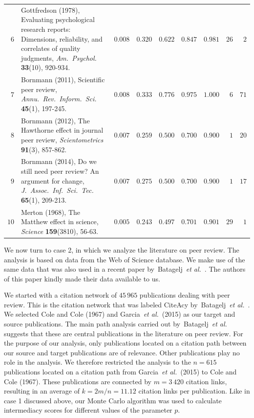 \documentclass[9pt,twocolumn,twoside,lineno]{pnas-alt}
\theoremstyle{definition}
\renewcommand{\etal}{~\emph{et al.}\xspace}
\begin{document}
\begin{sansmath}
\begin{table}
\begin{tabular}{rp{9.75cm}rrrrrrr}
    $6$ & Gottfredson (1978), Evaluating psychological research reports: Dimensions, reliability, and correlates of quality judgments, \textit{Am.\ Psychol.} \textbf{33}(10), 920-934. & $0.008$ & $0.320$ & $0.622$ & $0.847$ & $0.981$ & $26$ & $2$ \\
    $7$ & Bornmann (2011), Scientific peer review, \textit{Annu.\ Rev.\ Inform.\ Sci.} \textbf{45}(1), 197-245. & $0.008$ & $0.333$ & $0.776$ & $0.975$ & $1.000$ & $6$ & $71$ \\
    $8$ & Bornmann (2012), The Hawthorne effect in journal peer review, \textit{Scientometrics} \textbf{91}(3), 857-862. & $0.007$ & $0.259$ & $0.500$ & $0.700$ & $0.900$ & $1$ & $20$ \\
    $9$ & Bornmann (2014), Do we still need peer review? An argument for change, \textit{J.\ Assoc.\ Inf.\ Sci.\ Tec.} \textbf{65}(1), 209-213. & $0.007$ & $0.275$ & $0.500$ & $0.700$ & $0.900$ & $1$ & $17$ \\
    $10$ & Merton (1968), The Matthew effect in science, \textit{Science} \textbf{159}(3810), 56-63. & $0.005$ & $0.243$ & $0.497$ & $0.701$ & $0.901$ & $29$ & $1$ \\\bottomrule
  \end{tabular}
  \label{tbl:pr}
\end{table}\end{sansmath}

We now turn to case 2, in which we analyze the literature on peer review. The analysis is based on data from the Web of Science database. We make use of the same data that was also used in a recent paper by~Batagelj\etal~\cite{Batagelj2017}. The authors of this paper kindly made their data available to us.

We started with a citation network of $45\,965$ publications dealing with peer review. This is the citation network that was labeled CiteAcy by~Batagelj\etal~\cite{Batagelj2017}. We selected Cole and Cole (1967) and Garcia\etal~(2015) as our target and source publications. The main path analysis carried out by~Batagelj\etal~\cite{Batagelj2017} suggests that these are central publications in the literature on peer review. For the purpose of our analysis, only publications located on a citation path between our source and target publications are of relevance. Other publications play no role in the analysis. We therefore restricted the analysis to the $n = 615$ publications located on a citation path from Garcia\etal~(2015) to Cole and Cole (1967). These publications are connected by $m = 3\,420$ citation links, resulting in an average of $k = 2m / n = 11.12$ citation links per publication. Like in case 1 discussed above, our Monte Carlo algorithm was used to calculate intermediacy scores for different values of the parameter $p$.
\end{document}
